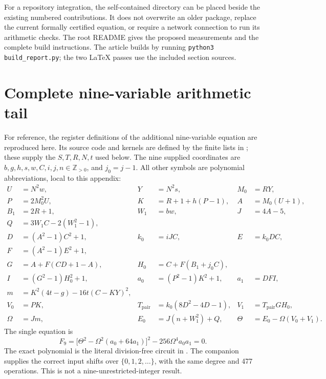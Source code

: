 \documentclass[11pt,a4paper]{article}
\newcommand{\Z}{\mathbb Z}
\theoremstyle{definition}
\theoremstyle{remark}
\begin{document}
For a repository integration, the self-contained directory can be placed
beside the existing numbered contributions.  It does not overwrite an older
package, replace the current formally certified equation, or require a
network connection to run its arithmetic checks.  The root README gives
the proposed measurements and the complete build instructions.  The
article builds by running \texttt{python3 build\_report.py}; the two LaTeX
passes use the included section sources.

\appendix
\section{Complete nine-variable arithmetic tail}
\label{app:tail}

For reference, the register definitions of the additional nine-variable
equation are reproduced here.  Its source code and kernels are defined by
the finite lists in ; these supply the
$S,T,R,N,t$ used below.  The nine supplied coordinates are
$b,g,h,s,w,C,i,j,n\in\Z_{>0}$, and $j_0=j-1$.  All other symbols are
polynomial abbreviations, local to this appendix:
\begin{align*}
U&=N^2w,& Y&=N^2s,& M_0&=RY,\\
P&=2M_0^2U,& K&=R+1+h(P-1),& A&=M_0(U+1),\\
B_1&=2R+1,& W_1&=bw,& J&=4A-5,\\
Q&=3W_1C-2(W_1^2-1),&&&\\
D&=(A^2-1)C^2+1,& k_0&=iJC,& E&=k_0DC,\\
F&=(A^2-1)E^2+1,&&&\\
G&=A+F(CD+1-A),& H_0&=C+F(B_1+j_0C),&&\\
I&=(G^2-1)H_0^2+1,& a_0&=(P^2-1)K^2+1,& a_1&=DFI,\\
m&=K^2(4t-g)-16t(C-KY)^2,&&&\\
V_0&=PK,& T_{\mathrm{pair}}&=k_0(8D^2-4D-1),&V_1&=T_{\mathrm{pair}}GH_0,\\
\Omega&=Jm,& E_0&=J(n+W_1^2)+Q,&\Theta&=E_0-\Omega(V_0+V_1).
\end{align*}
The single equation is
\[
F_9=\bigl[\Theta^2-\Omega^2(a_0+64a_1)\bigr]^2
       -256\Omega^4a_0a_1=0.
\]
The exact polynomial is the literal division-free circuit in
.  The companion
 supplies the correct input shifts over
$\{0,1,2,\ldots\}$, with the same degree and 477 operations.  This is not a
nine-unrestricted-integer result.
\end{document}
